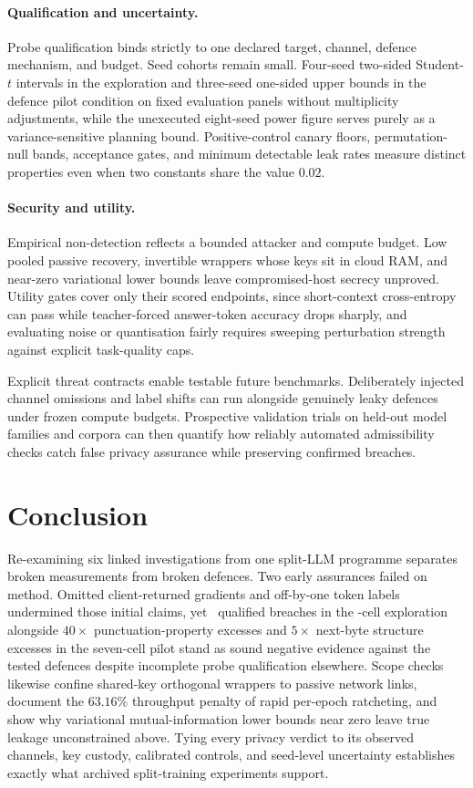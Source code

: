 \paragraph{Qualification and uncertainty.}
Probe qualification binds strictly to one declared target, channel, defence
mechanism, and budget. Seed cohorts remain small. Four-seed two-sided
Student-$t$ intervals in the exploration and three-seed one-sided upper
bounds in the defence pilot condition on fixed evaluation panels without
multiplicity adjustments, while the unexecuted eight-seed power figure
serves purely as a variance-sensitive planning bound. Positive-control
canary floors, permutation-null bands, acceptance gates, and minimum
detectable leak rates measure distinct properties even when two constants
share the value $0.02$.

\paragraph{Security and utility.}
Empirical non-detection reflects a bounded attacker and compute budget. Low
pooled passive recovery, invertible wrappers whose keys sit in cloud RAM,
and near-zero variational lower bounds leave compromised-host secrecy
unproved. Utility gates cover only their scored endpoints, since
short-context cross-entropy can pass while teacher-forced answer-token
accuracy drops sharply, and evaluating noise or quantisation fairly
requires sweeping perturbation strength against explicit task-quality caps.

Explicit threat contracts enable testable future benchmarks. Deliberately
injected channel omissions and label shifts can run alongside genuinely
leaky defences under frozen compute budgets. Prospective validation trials
on held-out model families and corpora can then quantify how reliably
automated admissibility checks catch false privacy assurance while
preserving confirmed breaches.

\section{Conclusion}

Re-examining six linked investigations from one split-LLM programme
separates broken measurements from broken defences. Two early assurances
failed on method. Omitted client-returned gradients and off-by-one token
labels undermined those initial claims, yet \RoneQualifiedBreaches\
qualified breaches in the \RoneCells-cell exploration alongside $40\times$
punctuation-property excesses and $5\times$ next-byte structure excesses in
the seven-cell pilot stand as sound negative evidence against the tested
defences despite incomplete probe qualification elsewhere. Scope checks
likewise confine shared-key orthogonal wrappers to passive network links,
document the $63.16\%$ throughput penalty of rapid per-epoch ratcheting,
and show why variational mutual-information lower bounds near zero leave
true leakage unconstrained above. Tying every privacy verdict to its
observed channels, key custody, calibrated controls, and seed-level
uncertainty establishes exactly what archived split-training experiments
support.

